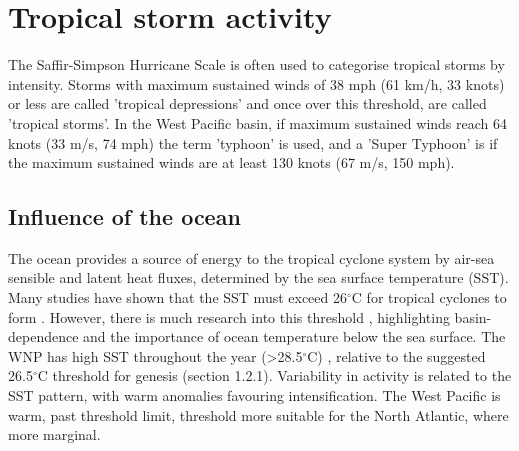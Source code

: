 


\section{Tropical storm activity}

The Saffir-Simpson Hurricane Scale \citep{simpson1974hurricane} is often used to categorise tropical storms by intensity. Storms with maximum sustained winds of 38 mph (61 km/h, 33 knots) or less are called 'tropical depressions' and once over this threshold, are called 'tropical storms'. In the West Pacific basin, if maximum sustained winds reach 64 knots (33 m/s, 74 mph) the term 'typhoon' is used, and a 'Super Typhoon' is if the maximum sustained winds are at least 130 knots (67 m/s, 150 mph). %

\subsection{Influence of the ocean} \label{ocean}

The ocean provides a source of energy to the tropical cyclone system by air-sea sensible and latent heat fluxes, determined by the sea surface temperature (SST). Many studies have shown that the SST must exceed 26$^{\circ}$C for tropical cyclones to form \citep[e.g.][]{palmen1948formation}. However, there is much research into this threshold \citep[e.g.][]{dare2011threshold, mctaggart2015revisiting}, highlighting basin-dependence and the importance of ocean temperature below the sea surface. The WNP has high SST throughout the year (\textgreater 28.5$^{\circ}$C) \citep{chan2007interannual}, relative to the suggested 26.5$^{\circ}$C threshold for genesis (section 1.2.1). Variability in activity is related to the SST pattern, with warm anomalies favouring intensification. The West Pacific is warm, past threshold limit, threshold more suitable for the North Atlantic, where more marginal.

